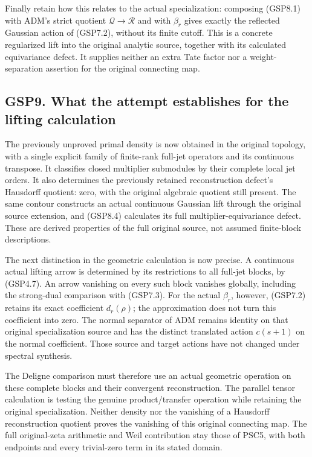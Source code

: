Finally retain how this relates to the actual specialization: composing
(GSP8.1) with ADM's strict quotient \(\mathcal Q\to\mathcal R\) and with
\(\beta_r\) gives exactly the reflected Gaussian action of (GSP7.2),
without its finite cutoff. This is a concrete regularized lift into the
original analytic source, together with its calculated equivariance
defect. It supplies neither an extra Tate factor nor a weight-separation
assertion for the original connecting map.

\subsection{GSP9. What the attempt establishes for the lifting
calculation}\label{gsp9.-what-the-attempt-establishes-for-the-lifting-calculation}

The previously unproved primal density is now obtained in the original
topology, with a single explicit family of finite-rank full-jet
operators and its continuous transpose. It classifies closed multiplier
submodules by their complete local jet orders. It also determines the
previously retained reconstruction defect's Hausdorff quotient: zero,
with the original algebraic quotient still present. The same contour
constructs an actual continuous Gaussian lift through the original
source extension, and (GSP8.4) calculates its full
multiplier-equivariance defect. These are derived properties of the full
original source, not assumed finite-block descriptions.

The next distinction in the geometric calculation is now precise. A
continuous actual lifting arrow is determined by its restrictions to all
full-jet blocks, by (GSP4.7). An arrow vanishing on every such block
vanishes globally, including the strong-dual comparison with (GSP7.3).
For the actual \(\beta_r\), however, (GSP7.2) retains its exact
coefficient \(d_r(\rho)\); the approximation does not turn this
coefficient into zero. The normal separator of ADM remains identity on
that original specialization source and has the distinct translated
action \(c(s+1)\) on the normal coefficient. Those source and target
actions have not changed under spectral synthesis.

The Deligne comparison must therefore use an actual geometric operation
on these complete blocks and their convergent reconstruction. The
parallel tensor calculation is testing the genuine product/transfer
operation while retaining the original specialization. Neither density
nor the vanishing of a Hausdorff reconstruction quotient proves the
vanishing of this original connecting map. The full original-zeta
arithmetic and Weil contribution stay those of PSC5, with both endpoints
and every trivial-zero term in its stated domain.

